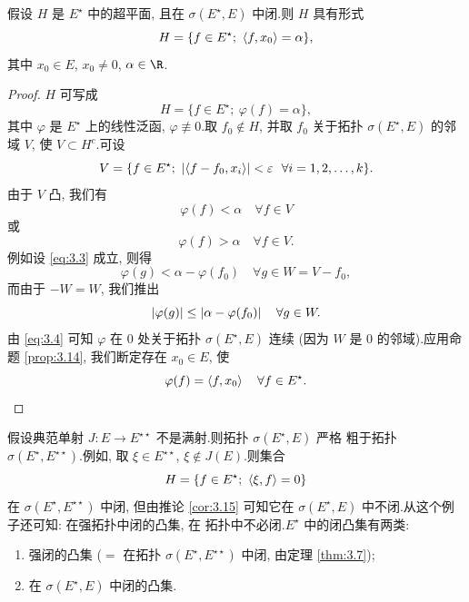 \begin{starcorollary}
\label{cor:3.15}
假设 $H$ 是 $E^\star$ 中的超平面, 且在 $\sigma(E^\star,E)$ 中闭.则 $H$ 具有形式
\begin{equation*}
H=\{f\in E^\star;\ \dual{f}{x_0}=\alpha\},
\end{equation*}
其中 $x_0\in E$, $x_0\ne0$, $\alpha\in\R$.
\end{starcorollary}

\begin{proof}
$H$ 可写成
\begin{equation*}
H=\{f\in E^\star;\ \varphi(f)=\alpha\},
\end{equation*}
其中 $\varphi$ 是 $E^\star$ 上的线性泛函, $\varphi\not\equiv0$.取
$f_0\notin H$, 并取 $f_0$ 关于拓扑 $\sigma(E^\star,E)$ 的邻域 $V$, 使
$V\subset H^c$.可设
\begin{equation*}
V=\{f\in E^\star;\ \abs{\dual{f-f_0}{x_i}}<\varepsilon\ \ \forall i=1,2,\dots,k\}.
\end{equation*}
由于 $V$ 凸, 我们有
\begin{equation}
\varphi(f)<\alpha\quad\forall f\in V
\label{eq:3.3}
\end{equation}
或
\begin{equation*}
\varphi(f)>\alpha\quad\forall f\in V.
\tag{3$'$}
\label{eq:3.3p}
\end{equation*}
例如设 \eqref{eq:3.3} 成立, 则得
\begin{equation*}
\varphi(g)<\alpha-\varphi(f_0)\quad\forall g\in W=V-f_0,
\end{equation*}
而由于 $-W=W$, 我们推出
\begin{equation}
\left|\varphi(g)\right|\le\left|\alpha-\varphi(f_0)\right|\quad\forall g\in W.
\label{eq:3.4}
\end{equation}
由 \eqref{eq:3.4} 可知 $\varphi$ 在 $0$ 处关于拓扑 $\sigma(E^\star,E)$ 连续 (因为
$W$ 是 $0$ 的邻域).应用命题  \ref{prop:3.14}, 我们断定存在 $x_0\in E$, 使
\begin{equation*}
\varphi(f)=\left\langle f,x_0\right\rangle\quad\forall f\in E^\star.
\end{equation*}
\end{proof}

\begin{remark}
\label{rem:3.11}
假设典范单射 $J:E\to E^{\star\star}$ 不是满射.则拓扑 $\sigma(E^\star,E)$ 严格
粗于拓扑 $\sigma(E^\star,E^{\star\star})$.例如, 取 $\xi\in E^{\star\star}$,
$\xi\notin J(E)$.则集合
\begin{equation*}
H=\{f\in E^\star;\ \dual{\xi}{f}=0\}
\end{equation*}
在 $\sigma(E^\star,E^{\star\star})$ 中闭, 但由推论  \ref{cor:3.15} 可知它在
$\sigma(E^\star,E)$ 中不闭.从这个例子还可知: 在强拓扑中闭的凸集, 在\wstar{}
拓扑中不必闭.$E^\star$ 中的闭凸集有两类:
\begin{enumerate}[label=(\alph*), leftmargin=2.0em, itemsep=0.15em]
	\item 强闭的凸集 ($=$ 在拓扑 $\sigma(E^\star,E^{\star\star})$ 中闭, 由定理
	       \ref{thm:3.7});
	\item 在 $\sigma(E^\star,E)$ 中闭的凸集.
\end{enumerate}
\end{remark}

